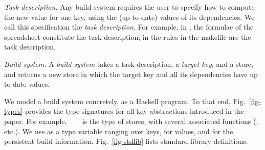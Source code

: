 \emph{Task description.} Any build system requires the user to specify how
to compute the new value for one key, using the (up to date) values of its
dependencies. We call this specification the \emph{task description}. For
example, in \Excel, the formulae of the spreadsheet constitute the task
description; in \Make the rules in the makefile are the task description.

\emph{Build system.} A \emph{build system} takes a task description, a
\emph{target key}, and a store, and returns a new store in which the target key
and all its dependencies have up to date values.

We model a build system concretely, as a Haskell program. To that end,
Fig.~\ref{fig-types} provides the type signatures for all key abstractions
introduced in the paper. For example, ~~~ is the
type of stores, with several associated functions (, etc.). We use
 as a type variable ranging over keys,  for values, and  for
the persistent build information. Fig.~\ref{fig-stdlib} lists standard library
definitions.

